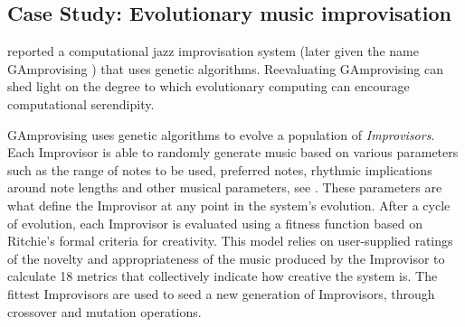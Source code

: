 
\subsection{Case Study: Evolutionary music improvisation} \label{sec:evomusic}

 reported a computational jazz improvisation system
(later given the name {\sf GAmprovising} \cite{jordanous:12}) that
uses genetic algorithms.  Reevaluating {\sf GAmprovising} can shed
light on the degree to which evolutionary computing can encourage
computational serendipity.

{\sf GAmprovising} uses genetic algorithms to evolve a population of \emph{Improvisors}. Each Improvisor is able to randomly generate music based on various parameters such as the range of notes to be used, preferred notes, rhythmic implications around note lengths and other musical parameters, see \cite{jordanous10}. These parameters are what define the Improvisor at any point in the system's evolution.  After a cycle of evolution, each Improvisor is evaluated using a fitness function based on Ritchie's \citeyear{ritchie07} formal criteria for creativity.  This model relies on user-supplied ratings of the novelty and appropriateness of the music produced by the Improvisor to calculate 18 metrics that collectively indicate how creative the system is.  The fittest Improvisors are used to seed a new generation of Improvisors, through crossover and mutation operations.

